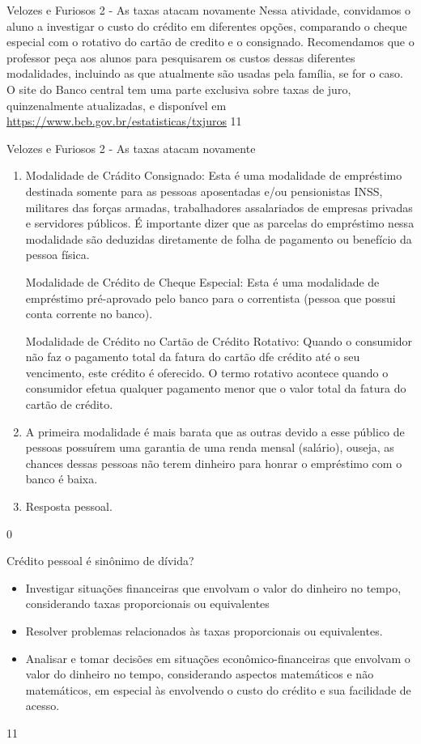 \begin{sugestions}{Velozes e Furiosos 2 - As taxas atacam novamente}
{
Nessa atividade, convidamos o aluno a investigar o custo do crédito em diferentes opções, comparando o cheque especial com o rotativo do cartão de credito e o consignado. Recomendamos que o professor peça aos alunos para pesquisarem os custos dessas diferentes modalidades, incluindo as que atualmente são usadas pela família, se for o caso. O site do Banco central tem uma parte exclusiva sobre taxas de juro, quinzenalmente atualizadas, e disponível em \url{https://www.bcb.gov.br/estatisticas/txjuros}
}{1}{1}
\end{sugestions}
\begin{answer}{Velozes e Furiosos 2 - As taxas atacam novamente}
{
  \begin{enumerate}
    \item Modalidade de Crádito Consignado: Esta é uma modalidade de empréstimo destinada somente para as pessoas aposentadas e/ou pensionistas INSS, militares das forças armadas, trabalhadores assalariados de empresas privadas e servidores públicos. É importante dizer que as parcelas do empréstimo nessa modalidade são deduzidas diretamente de folha de pagamento ou benefício da pessoa física.

    Modalidade de Crédito de Cheque Especial: Esta é uma modalidade de empréstimo pré-aprovado pelo banco para o correntista (pessoa que possui conta corrente no banco).

    Modalidade de Crédito no Cartão de Crédito Rotativo: Quando o consumidor não faz o pagamento total da fatura do cartão dfe crédito até o seu vencimento, este crédito é oferecido. O termo rotativo acontece quando o consumidor efetua qualquer pagamento menor que o valor total da fatura do cartão de crédito.

    \item A primeira modalidade é mais barata que as outras devido a esse público de pessoas possuírem uma garantia de uma renda mensal (salário), ouseja, as chances dessas pessoas não terem dinheiro para honrar o empréstimo com o banco é baixa.

    \item Resposta pessoal.
  \end{enumerate}
}{0}
\end{answer}
\begin{objectives}{Crédito pessoal é sinônimo de dívida?}
{
\begin{itemize}
\item Investigar situações financeiras que envolvam o valor do dinheiro no tempo, considerando taxas proporcionais ou equivalentes
\item Resolver problemas relacionados às taxas proporcionais ou equivalentes.
\item Analisar e tomar decisões em situações econômico-financeiras que envolvam o valor do dinheiro no tempo, considerando aspectos matemáticos e não matemáticos, em especial às envolvendo o custo do crédito e sua facilidade de acesso.
\end{itemize}
}{1}{1}
\end{objectives}
